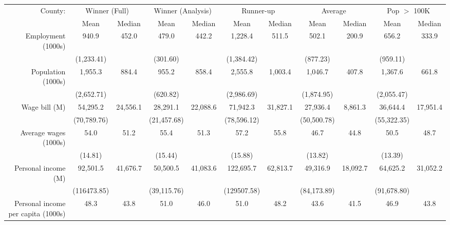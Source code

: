 \begin{tabular}{r*{5}{c}*{5}{c}} \toprule 
County:             &\multicolumn{2}{c}{Winner (Full)}&\multicolumn{2}{c}{Winner (Analysis)}&\multicolumn{2}{c}{Runner-up}&\multicolumn{2}{c}{Average}&\multicolumn{2}{c}{Pop $ >$ 100K }\\\cline{2-11}
                    &        Mean&      Median&        Mean&      Median&        Mean&      Median&        Mean&      Median&        Mean&      Median\\
\midrule
Employment (1000s)  &       940.9&       452.0&       479.0&       442.2&     1,228.4&       511.5&       502.1&       200.9&       656.2&       333.9\\
                    &  (1,233.41)&            &    (301.60)&            &  (1,384.42)&            &    (877.23)&            &    (959.11)&            \\
Population (1000s)  &     1,955.3&       884.4&       955.2&       858.4&     2,555.8&     1,003.4&     1,046.7&       407.8&     1,367.6&       661.8\\
                    &  (2,652.71)&            &    (620.82)&            &  (2,986.69)&            &  (1,874.95)&            &  (2,055.47)&            \\
Wage bill (M)       &    54,295.2&    24,556.1&    28,291.1&    22,088.6&    71,942.3&    31,827.1&    27,936.4&     8,861.3&    36,644.4&    17,951.4\\
                    & (70,789.76)&            & (21,457.68)&            & (78,596.12)&            & (50,500.78)&            & (55,322.35)&            \\
Average wages (1000s)&        54.0&        51.2&        55.4&        51.3&        57.2&        55.8&        46.7&        44.8&        50.5&        48.7\\
                    &     (14.81)&            &     (15.44)&            &     (15.88)&            &     (13.82)&            &     (13.39)&            \\
Personal income (M) &    92,501.5&    41,676.7&    50,500.5&    41,083.6&   122,695.7&    62,813.7&    49,316.9&    18,092.7&    64,625.2&    31,052.2\\
                    & (116473.85)&            & (39,115.76)&            & (129507.58)&            & (84,173.89)&            & (91,678.80)&            \\
Personal income per capita (1000s)&        48.3&        43.8&        51.0&        46.0&        51.0&        48.2&        43.6&        41.5&        46.9&        43.8\\

\end{tabular}
